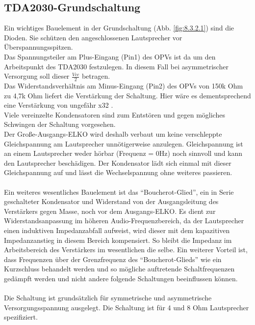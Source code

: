 \subsection{TDA2030-Grundschaltung}\label{subsec:8.3.2}
Ein wichtiges Bauelement in der Grundschaltung (Abb. \ref{fig:8.3.2.1}) sind die Dioden. Sie schützen den angeschlossenen Lautsprecher vor Überspannungsspitzen.\\
Das Spannungsteiler am Plus-Eingang (Pin1) des OPVs ist da um den Arbeitspunkt des TDA2030 festzulegen.
In diesem Fall bei asymmetrischer Versorgung soll dieser $\frac{Vcc}{2}$ betragen.\\
Das Widerstandsverhältnis am Minus-Eingang (Pin2) des OPVs von 150k Ohm zu 4,7k Ohm liefert die Verstärkung der Schaltung.
Hier wäre es dementsprechend eine Verstärkung von ungefähr x32 .\\
Viele vereinzelte Kondensatoren sind zum Entstören und gegen mögliches Schwingen der Schaltung vorgesehen.\\
Der Große-Ausgangs-ELKO wird deshalb verbaut um keine verschleppte Gleichspannung am Lautsprecher unnötigerweise anzulegen.
Gleichspannung ist an einem Lautsprecher weder hörbar (Frequenz = 0Hz) noch sinnvoll und kann den Lautsprecher beschädigen.
Der Kondensator lädt sich einmal mit dieser Gleichspannung auf und lässt die Wechselspannung ohne weiteres passieren.\\\\
Ein weiteres wesentliches Bauelement ist das \enquote{Boucherot-Glied}, ein in Serie geschalteter Kondensator und Widerstand von der Ausgangsleitung des Verstärkers gegen Masse, noch vor dem Ausgangs-ELKO.
Es dient zur Widerstandsanpassung im höheren Audio-Frequenzbereich, da der Lautsprecher einen induktiven Impedanzabfall aufweist, wird dieser mit dem kapazitiven Impedanzanstieg in diesem Bereich kompensiert.
So bleibt die Impedanz im Arbeitsbereich des Verstärkers im wesentlichen die selbe.
Ein weiterer Vorteil ist, dass Frequenzen über der Grenzfrequenz des \enquote{Boucherot-Glieds} wie ein Kurzschluss behandelt werden und so mögliche auftretende Schaltfrequenzen gedämpft werden und nicht andere folgende Schaltungen beeinflussen können.\\\\
Die Schaltung ist grundsätzlich für symmetrische und asymmetrische Versorgungsspannung ausgelegt. 
Die Schaltung ist für 4 und 8 Ohm Lautsprecher spezifiziert.
\newpage
